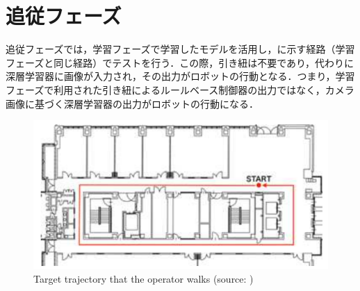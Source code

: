 
\section{追従フェーズ}

  追従フェーズでは，学習フェーズで学習したモデルを活用し，に示す経路（学習フェーズと同じ経路）でテストを行う．この際，引き紐は不要であり，代わりに深層学習器に画像が入力され，その出力がロボットの行動となる．つまり，学習フェーズで利用された引き紐によるルールベース制御器の出力ではなく，カメラ画像に基づく深層学習器の出力がロボットの行動になる．

  \vspace{1.5cm}

  \begin{figure}[h]
    \centering
    \includegraphics[keepaspectratio, scale=1.2] {images/pdf/okada_route}
    \caption[Target trajectory that the operator walks]{Target trajectory that the operator walks (source: \cite{okada})}
    \label{Fig:okada_route}
  \end{figure}

\newpage